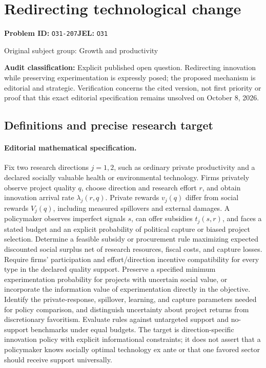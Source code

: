 \documentclass[11pt,a4paper]{article}
\begin{document}
\section*{Redirecting technological change}
\textbf{Problem ID:} \texttt{O31-207}\quad \textbf{JEL:} \texttt{O31}\par
\label{problem:OP-0270}
{\sffamily\small\color{muted}Original subject group: Growth and productivity\par}
\label{definitions:problem:30007551}
\textbf{Audit classification:} Explicit published open question. Redirecting innovation while preserving experimentation is expressly posed; the proposed mechanism is editorial and strategic. Verification concerns the cited version, not first priority or proof that this exact editorial specification remains unsolved on October 8, 2026.
\subsection*{Definitions and precise research target}
\paragraph{Editorial mathematical specification.} Fix two research directions \(j=1,2\), such as ordinary private productivity and a declared socially valuable health or environmental technology. Firms privately observe project quality \(q\), choose direction and research effort \(r\), and obtain innovation arrival rate \(\lambda_j(r,q)\). Private rewards \(v_j(q)\) differ from social rewards \(V_j(q)\), including measured spillovers and external damages. A policymaker observes imperfect signals \(s\), can offer subsidies \(t_j(s,r)\), and faces a stated budget and an explicit probability of political capture or biased project selection.
Determine a feasible subsidy or procurement rule maximizing expected discounted social surplus net of research resources, fiscal costs, and capture losses. Require firms’ participation and effort/direction incentive compatibility for every type in the declared quality support. Preserve a specified minimum experimentation probability for projects with uncertain social value, or incorporate the information value of experimentation directly in the objective.
Identify the private-response, spillover, learning, and capture parameters needed for policy comparison, and distinguish uncertainty about project returns from discretionary favoritism. Evaluate rules against untargeted support and no-support benchmarks under equal budgets. The target is direction-specific innovation policy with explicit informational constraints; it does not assert that a policymaker knows socially optimal technology ex ante or that one favored sector should receive support universally.
\end{document}
